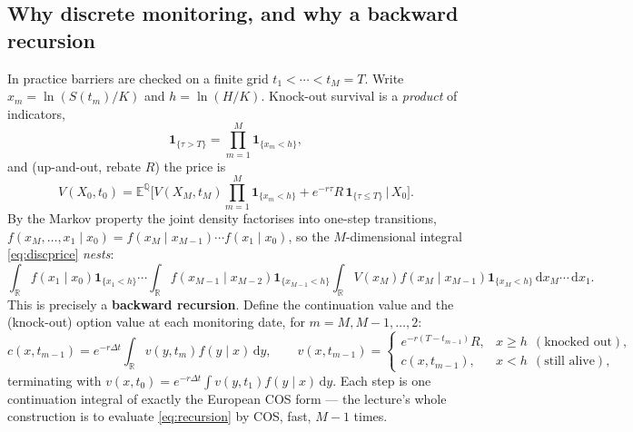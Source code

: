 \documentclass[11pt]{article}
\newcommand{\R}{\mathbb{R}}
\newcommand{\E}{\mathbb{E}}
\newcommand{\Q}{\mathbb{Q}}
\newcommand{\dd}{\,\mathrm{d}}
\begin{document}
\subsection{Why discrete monitoring, and why a backward recursion}
In practice barriers are checked on a finite grid $t_1<\cdots<t_M=T$. Write $x_m=\ln(S(t_m)/K)$ and
$h=\ln(H/K)$. Knock-out survival is a \emph{product} of indicators,
\begin{equation}
\mathbf 1_{\{\tau>T\}}=\prod_{m=1}^{M}\mathbf 1_{\{x_m<h\}},
\end{equation}
and (up-and-out, rebate $R$) the price is
\begin{equation}\label{eq:discprice}
V(X_0,t_0)=\E^{\Q}\!\Big[V(X_M,t_M)\textstyle\prod_{m=1}^M\mathbf 1_{\{x_m<h\}}
+e^{-r\tau}R\,\mathbf 1_{\{\tau\le T\}}\,\Big|\,X_0\Big].
\end{equation}
By the Markov property the joint density factorises into one-step transitions,
$f(x_M,\dots,x_1\mid x_0)=f(x_M\mid x_{M-1})\cdots f(x_1\mid x_0)$, so the $M$-dimensional integral
\eqref{eq:discprice} \emph{nests}:
\begin{equation}
\int_{\R}f(x_1\mid x_0)\mathbf 1_{\{x_1<h\}}\cdots
\int_{\R}f(x_{M-1}\mid x_{M-2})\mathbf 1_{\{x_{M-1}<h\}}
\int_{\R}V(x_M)f(x_M\mid x_{M-1})\mathbf 1_{\{x_M<h\}}\dd x_M\cdots\dd x_1 .
\end{equation}
This is precisely a \textbf{backward recursion}. Define the continuation value and the (knock-out) option
value at each monitoring date, for $m=M,M-1,\dots,2$:
\begin{equation}\label{eq:recursion}
c(x,t_{m-1})=e^{-r\Delta t}\!\int_{\R}v(y,t_m)f(y\mid x)\dd y,\qquad
v(x,t_{m-1})=
\begin{cases}
e^{-r(T-t_{m-1})}R, & x\ge h\ \ (\text{knocked out}),\\[2pt]
c(x,t_{m-1}), & x<h\ \ (\text{still alive}),
\end{cases}
\end{equation}
terminating with $v(x,t_0)=e^{-r\Delta t}\int v(y,t_1)f(y\mid x)\dd y$. Each step is one continuation integral
of exactly the European COS form --- the lecture's whole construction is to evaluate \eqref{eq:recursion} by
COS, fast, $M-1$ times.
\end{document}
